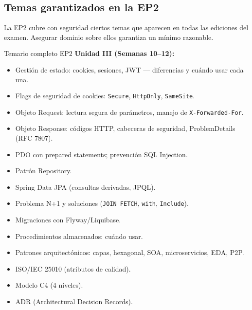 \documentclass[11pt,a4paper,openany]{book}
\begin{document}
\subsection{Temas garantizados en la EP2}

La EP2 cubre con seguridad ciertos temas que aparecen en
todas las ediciones del examen. Asegurar dominio sobre ellos
garantiza un mínimo razonable.


\begin{cajaadvertencia}{Temario completo EP2}
\textbf{Unidad III (Semanas 10--12):}
\begin{itemize}
\item Gestión de estado: cookies, sesiones, JWT --- diferencias y
cuándo usar cada una.
\item Flags de seguridad de cookies: \texttt{Secure}, \texttt{HttpOnly},
\texttt{SameSite}.
\item Objeto Request: lectura segura de parámetros, manejo de
\texttt{X-Forwarded-For}.
\item Objeto Response: códigos HTTP, cabeceras de seguridad,
ProblemDetails (RFC 7807).
\item PDO con prepared statements; prevención SQL Injection.
\item Patrón Repository.
\item Spring Data JPA (consultas derivadas, JPQL).
\item Problema N+1 y soluciones (\texttt{JOIN FETCH}, \texttt{with},
\texttt{Include}).
\item Migraciones con Flyway/Liquibase.
\item Procedimientos almacenados: cuándo usar.
\item Patrones arquitectónicos: capas, hexagonal, SOA, microservicios,
EDA, P2P.
\item ISO/IEC 25010 (atributos de calidad).
\item Modelo C4 (4 niveles).
\item ADR (Architectural Decision Records).
\end{itemize}


\end{cajaadvertencia}
\end{document}
